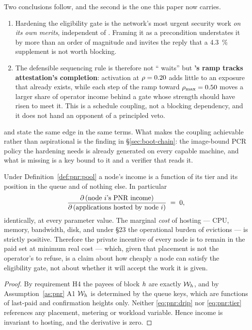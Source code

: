 Two conclusions follow, and the second is the one this paper now carries.
\begin{enumerate}
  \item Hardening the eligibility gate is the network's most urgent security work \emph{on its own
  merits}, independent of \PNR{}. Framing it as a \PNR{} precondition understates it by more than an
  order of magnitude and invites the reply that a \SI{4.3}{\percent} supplement is not worth blocking.
  \item The defensible sequencing rule is therefore not ``\PNR{} waits'' but \textbf{\PNR{}'s ramp
  tracks attestation's completion}: activation at $\rho = 0.20$ adds little to an exposure that
  already exists, while each step of the ramp toward $\rho_{\max} = 0.50$ moves a larger share of
  operator income behind a gate whose strength should have risen to meet it. This is a schedule
  coupling, not a blocking dependency, and it does not hand an opponent of \PNR{} a principled veto.
\end{enumerate}
 and  state the same edge in the same terms. What makes the
coupling achievable rather than aspirational is the finding in
\S\ref{sec:boot-chain}: the image-bound PCR policy the hardening needs is already generated on every
capable machine, and what is missing is a key bound to it and a verifier that reads it.

\begin{property}
\label{prop:pnr:nohosting}
Under Definition~\ref{def:pnr:pool} a node's \PNR income is a function of its tier and its position
in the \PoN queue and of nothing else. In particular
\[
  \frac{\partial\,(\text{node $i$'s \PNR income})}{\partial\,(\text{applications hosted by node } i)}
  \;=\; 0 ,
\]
identically, at every parameter value. The marginal \emph{cost} of hosting --- CPU, memory,
bandwidth, disk, and under \S23 the operational burden of evictions --- is strictly positive.
Therefore the private incentive of every node is to remain in the paid set at minimum real cost ---
which, given that placement is not the operator's to refuse, is a claim about how cheaply a node can
satisfy the eligibility gate, not about whether it will accept the work it is given.
\end{property}

\begin{proof}
By requirement H4 the \PNR payees of block $h$ are exactly $\mathcal{W}_{h}$, and by
Assumption~\ref{as:pnr} A1 $\mathcal{W}_{h}$ is determined by the queue keys, which are functions of
last-paid and confirmation heights only. Neither \eqref{eq:pnr:drip} nor \eqref{eq:pnr:tier}
references any placement, metering or workload variable. Hence income is invariant to hosting, and
the derivative is zero.
\end{proof}

